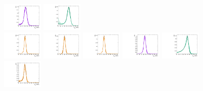 \begin{figure}[htbp]
  \includegraphics[width=0.18\textwidth]{fig/analysisAppendix/templateSignalVsMX_fromDC_WprToWZ_MJJ_mu_LP_bb_LDy.pdf}
  \includegraphics[width=0.18\textwidth]{fig/analysisAppendix/templateSignalVsMX_fromDC_WprToWH_MJJ_mu_LP_bb_LDy.pdf}\\
  \includegraphics[width=0.18\textwidth]{fig/analysisAppendix/templateSignalVsMX_fromDC_GbuToWW_MJJ_mu_HP_nobb_LDy.pdf}
  \includegraphics[width=0.18\textwidth]{fig/analysisAppendix/templateSignalVsMX_fromDC_RadToWW_MJJ_mu_HP_nobb_LDy.pdf}
  \includegraphics[width=0.18\textwidth]{fig/analysisAppendix/templateSignalVsMX_fromDC_ZprToWW_MJJ_mu_HP_nobb_LDy.pdf}
  \includegraphics[width=0.18\textwidth]{fig/analysisAppendix/templateSignalVsMX_fromDC_WprToWZ_MJJ_mu_HP_nobb_LDy.pdf}
  \includegraphics[width=0.18\textwidth]{fig/analysisAppendix/templateSignalVsMX_fromDC_WprToWH_MJJ_mu_HP_nobb_LDy.pdf}\\
  \includegraphics[width=0.18\textwidth]{fig/analysisAppendix/templateSignalVsMX_fromDC_GbuToWW_MJJ_mu_LP_nobb_LDy.pdf}

\end{figure}
